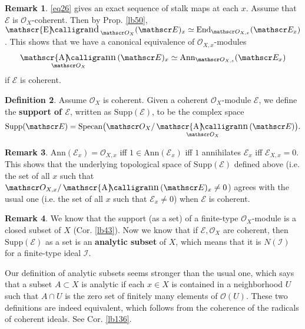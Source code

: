 \documentclass[12pt,b5paper,notitlepage]{report}
\theoremstyle{definition}
\newtheorem{df}{Definition}[section]
\newtheorem{rem}[df]{Remark}
\theoremstyle{plain}
\DeclareMathOperator{\sann}{\mathscr{A}\text{\kern -3pt {\calligra\large nn}}\,}
\DeclareMathOperator{\send}{\mathscr{E}\text{\kern -3pt {\calligra\large nd}}\,}
\newcommand{\mc}{\mathcal}
\newcommand{\End}{\mathrm{End}} %
\newcommand{\scr}{\mathscr}
\newcommand{\Ann}{\mathrm{Ann}}
\newcommand{\Supp}{\mathrm{Supp}}
\newcommand{\Specan}{\mathrm{Specan}}
\numberwithin{equation}{section}
\begin{document}
\begin{rem}
\eqref{eq26} gives an exact sequence of stalk maps at each $x$. Assume that $\scr E$ is $\scr O_X$-coherent. Then by Prop. \ref{lb50}, $\send_{\scr O_X}(\scr E)_x\simeq\End_{\scr O_{X,x}}(\scr E_x)$. This shows that we have a canonical equivalence of $\scr O_{X,x}$-modules
\begin{align}
\sann_{\scr O_X}(\scr E)_x\simeq\Ann_{\scr O_{X,s}}(\scr E_x)\label{eq36}
\end{align}
if $\scr E$ is coherent.
\end{rem}



\begin{df}\label{lb186}
Assume $\scr O_X$ is coherent. Given a coherent $\scr O_X$-module $\scr E$, we define the \textbf{support of $\scr E$}, written as $\Supp(\scr E)$, \index{00@Support of a sheaf $\Supp(\scr E)$} to be the complex space
\begin{align}
\Supp(\scr E)=\Specan\big(\scr O_X/\sann_{\scr O_X}(\scr E)\big).
\end{align}
\end{df}

\begin{rem}
$\Ann(\scr E_x)=\scr O_{X,x}$ iff $1\in\Ann(\scr E_x)$ iff $1$ annihilates $\scr E_x$ iff $\scr E_{X,x}=0$. This shows that the underlying topological space of $\Supp(\scr E)$ defined above (i.e. the set of all $x$ such that $\scr O_{X,x}/\sann(\scr E)_x\neq 0$) agrees with the usual one (i.e. the set of all $x$ such that $\scr E_x\neq 0$) when $\scr E$ is coherent.
\end{rem}


\begin{rem}\label{lb167}
We know that the support  (as a set) of a finite-type $\scr O_X$-module is a closed subset of $X$ (Cor. \ref{lb43}). Now we know that if $\scr E,\scr O_X$ are coherent, then $\Supp(\scr E)$ as a set is an \textbf{analytic subset}  of $X$, which means that it is $N(\mc I)$ for a finite-type ideal $\mc I$.
\end{rem}

Our definition of analytic subsets seems stronger than the usual one, which says that a subset $A\subset X$ is analytic if each $x\in X$ is contained in a neighborhood $U$ such that $A\cap U$ is the zero set of finitely many elements of $\scr O(U)$. These two definitions are indeed equivalent, which follows from the coherence of the radicals of coherent ideals. See Cor. \ref{lb136}.
\end{document}
